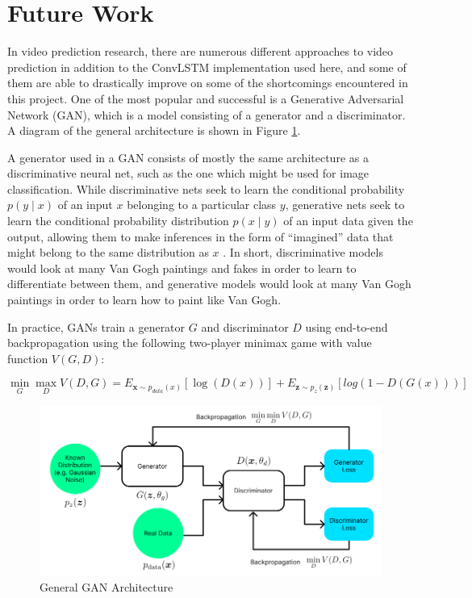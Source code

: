 \documentclass{scrartcl}
\begin{document}
\newpage
\section{Future Work}
\label{sec:future_work}

In video prediction research, there are numerous different approaches to video
prediction in addition to the ConvLSTM implementation used here, and some of
them are able to drastically improve on some of the shortcomings encountered in
this project. One of the most popular and successful is a Generative
Adversarial Network (GAN), which is a model consisting of a generator and a
discriminator. A diagram of the general architecture is shown in Figure
\ref{fig:gan_arch}.

A generator used in a GAN consists of mostly the same architecture as a
discriminative neural net, such as the one which might be used for image
classification. While discriminative nets seek to learn the conditional
probability $p(y \mid x)$ of an input $x$ belonging to a particular class $y$,
generative nets seek to learn the conditional probability distribution $p(x
\mid y)$ of an input data given the output, allowing them to make inferences in
the form of ``imagined'' data that might belong to the same distribution as $x$
\cite{gan_original}. In short, discriminative models would look at many Van
Gogh paintings and fakes in order to learn to differentiate between them, and
generative models would look at many Van Gogh paintings in order to learn how
to paint like Van Gogh. 

In practice, GANs train a generator $G$ and discriminator $D$  using end-to-end
backpropagation using the following two-player minimax game with value function
$V(G, D)$: 

\begin{equation}
	\min_G \max_D V(D, G) = E_{\boldsymbol{x} \sim p_{data} (x)} [ \log (D(x)) ] 
	+ E_{\boldsymbol{z} \sim p_z (\boldsymbol{z})} [ log(1 - D(G(x))) ] 
	\label{eq:gan_value_function}
\end{equation}

\begin{figure}[H]
	\begin{center}
		\includegraphics[width=1\textwidth]{figures/gan_arch.png}
	\end{center}
	\caption{General GAN Architecture}
	\label{fig:gan_arch}
\end{figure}
\end{document}
